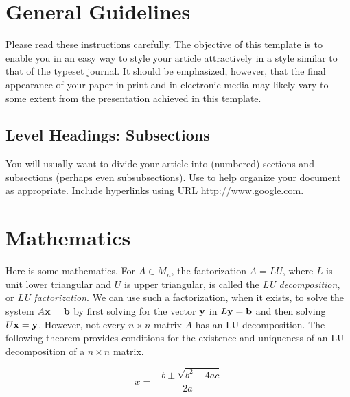 \section*{General Guidelines}
\noindent Please read these instructions carefully.   The objective of this template is to enable you in an easy way to style your article attractively in a style similar to that of the typeset journal. It should be emphasized, however, that the final appearance of your paper in print and in electronic media may likely vary to some extent from the presentation achieved in this template.


\subsection*{Level Headings: Subsections}
\noindent You will usually want to divide your article into (numbered) sections and subsections (perhaps even subsubsections).  Use to help organize your document as appropriate. Include hyperlinks using  URL \url{http://www.google.com}.  


\section*{Mathematics}\label{sec:lu}
Here is some mathematics.  For $A \in M_n$, the factorization $A = LU$, where $L$ is unit lower triangular and $U$ is upper triangular,  is called the \textit{LU decomposition}, or \textit{LU factorization}.  We can use such a factorization, when it exists, to solve the system $A {\bf x} = {\bf b}$ by first solving for the vector $\bf{y}$ in $L {\bf y} = {\bf b}$ 
and then solving 
$
U {\bf x} = {\bf y}
$. 
However, not every $n \times n$ matrix $A$ has an LU decomposition.  The following theorem provides conditions for the existence and uniqueness of an LU decomposition of a $n \times n$ matrix.

\begin{equation}\label{eqn:quad}
x = \frac{-b \pm \sqrt{b^2 - 4ac}}{2a}
\end{equation}
  
